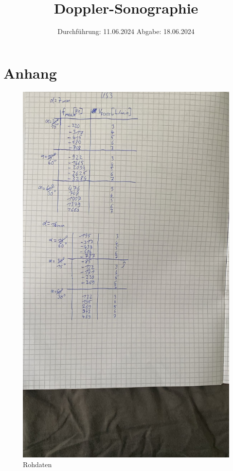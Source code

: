

\subject{VUS3}
\title{Doppler-Sonographie}
\date{%
  Durchführung: 11.06.2024
  \hspace{3em}
  Abgabe: 18.06.2024
}



\maketitle
\thispagestyle{empty}
\tableofcontents
\newpage






\printbibliography{}
\section{Anhang}
\begin{figure}[H]
  \includegraphics[width=\textwidth]{Bilder/rohdaten1.jpg}
  \caption{Rohdaten}
\end{figure}
